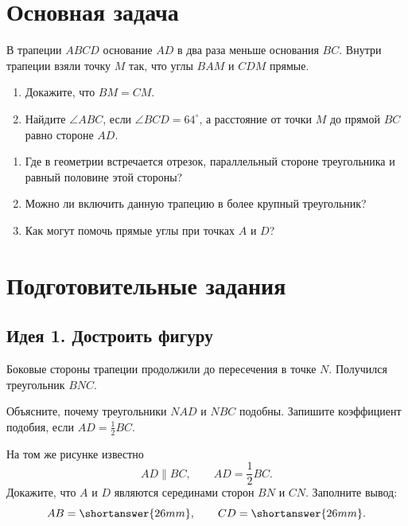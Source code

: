 

\studentnameblock

\section{Основная задача}

\begin{problembox}
В трапеции \(ABCD\) основание \(AD\) в два раза меньше основания \(BC\).
Внутри трапеции взяли точку \(M\) так, что углы \(BAM\) и \(CDM\) прямые.

\begin{enumerate}
  \item[а)] Докажите, что \(BM=CM\).
  \item[б)] Найдите \(\angle ABC\), если \(\angle BCD=64^\circ\), а расстояние
  от точки \(M\) до прямой \(BC\) равно стороне \(AD\).
\end{enumerate}
\end{problembox}
\vspace{2cm}
\trapezoidproblemfigure

\begin{questionsbox}
\begin{enumerate}
  \item Где в геометрии встречается отрезок, параллельный стороне треугольника
  и равный половине этой стороны?
  \item Можно ли включить данную трапецию в более крупный треугольник?
  \item Как могут помочь прямые углы при точках \(A\) и \(D\)?
\end{enumerate}
\end{questionsbox}



\section{Подготовительные задания}

\subsection{Идея 1. Достроить фигуру}

\begin{trainingtask}
Боковые стороны трапеции продолжили до пересечения в точке \(N\).
Получился треугольник \(BNC\).

\hiddentrianglefigure

Объясните, почему треугольники \(NAD\) и \(NBC\) подобны. Запишите
коэффициент подобия, если \(AD=\frac12BC\).
\answerline[1]

\medskip
На том же рисунке известно
\[
AD\parallel BC,
\qquad
AD=\frac12BC.
\]
Докажите, что \(A\) и \(D\) являются серединами сторон \(BN\) и \(CN\).
Заполните вывод:
\[
AB=\shortanswer{26mm},
\qquad
CD=\shortanswer{26mm}.
\]
\answerline[2]
\end{trainingtask}

